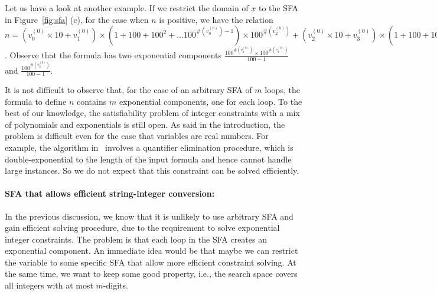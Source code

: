 \documentclass[sigplan,review,anonymous]{acmart}\settopmatter{printfolios=true,printccs=false,printacmref=false}
\begin{document}
Let us have a look at another example. If we restrict the domain of $x$ to the SFA in Figure~\ref{fig:sfa} (c), for the case when $n$ is positive, we have the relation $n= (v_0^{(0)}\times 10+ v_1^{(0)}) \times (1+100 +100^2 + \ldots 100 ^{\#(v_0^{(0)})-1})\times 100^{\#(v_2^{(0)})}+(v_2^{(0)}\times 10+ v_3^{(0)}) \times (1+100 +100^2 + \ldots 100 ^{\#(v_2^{(0)})-1}) =  (v_0^{(0)}\times 10+ v_1^{(0)}) \times \frac{100^{\#(v_0^{(0)})}-1}{100-1}\times 100^{\#(v_2^{(0)})} + (v_2^{(0)}\times 10+ v_3^{(0)}) \times \frac{100^{\#(v_2^{(0)})}-1}{100-1}$. Observe that the formula has two exponential components $\frac{100^{\#(v_0^{(0)})}\times 100^{\#(v_2^{(0)})} }{100-1}$ and $\frac{100^{\#(v_2^{(0)})} }{100-1}$.

It is not difficult to observe that, for the case of an arbitrary SFA of $m$ loops, the formula to define $n$ contains $m$ exponential components, one for each loop.
To the best of our knowledge, the satisfiability problem of integer constraints with a mix of polynomials and exponentials is still open. As said in the introduction, the problem is difficult even for the case that variables are real numbers. For example, the algorithm in~\cite{kincaid2019closed} involves a quantifier elimination procedure, which is double-exponential to the length of the input formula and hence cannot handle large instances. So we do not expect that this constraint can be solved efficiently.

\paragraph{SFA that allows efficient string-integer conversion: } In the previous discussion, we know that it is unlikely to use arbitrary SFA and gain efficient solving procedure, due to the requirement to solve exponential integer constraints. The problem is that each loop in the SFA creates an exponential component. An immediate idea would be that maybe we can restrict the variable to some specific SFA that allow more efficient constraint solving. At the same time, we want to keep some good property, i.e., the search space covers all integers with at most $m$-digits.
\end{document}
